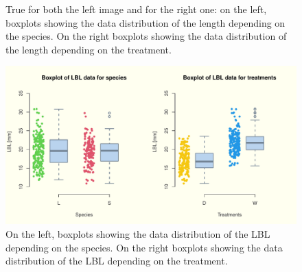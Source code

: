 \documentclass{article}
\begin{document}
\begin{figure}[H]
     \centering
     \caption{True for both the left image and for the right one: on the left, boxplots showing the data distribution of the length depending on the species. On the right boxplots showing the data distribution of the length depending on the treatment.}
      \qquad
\end{figure}
\iffalse
\begin{figure}[H]
\centering
  \includegraphics[scale=0.5]{boxplots_lbl.pdf}
\caption{On the left, boxplots showing the data distribution of the LBL depending on the species. On the right boxplots showing the data distribution of the LBL depending on the treatment.}
  \label{fig:boxi1}
\end{figure}
\end{document}
